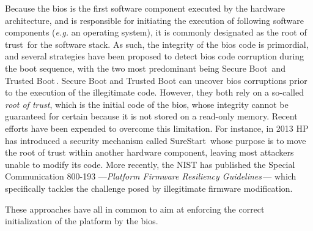 Because the \ac{bios} is the first software component executed by the hardware
architecture, and is responsible for initiating the execution of following
software components (\emph{e.g.} an operating system), it is commonly designated
as the root of trust\,\cite{rutkowska2015intel} for the software stack.
%
As such, the integrity of the \ac{bios} code is primordial, and several
strategies have been proposed to detect \ac{bios} code corruption during the
boot sequence, with the two most predominant being Secure
Boot\,\cite{rosenbaum2012secboot} and Trusted Boot\,\cite{trustedboot}.
%
Secure Boot and Trusted Boot can uncover \ac{bios} corruptions prior to the
execution of the illegitimate code.
%
However, they both rely on a so-called \emph{root of trust}, which is the
initial code of the \ac{bios}, whose integrity cannot be guaranteed for certain
because it is not stored on a read-only memory.
%
Recent efforts have been expended to overcome this limitation.
%
For instance, in 2013 HP has introduced a security mechanism called
SureStart\,\cite{hp2016surestart} whose purpose is to move the root of trust
within another hardware component, leaving most attackers unable to modify its
code.
%
More recently, the NIST has published the Special Communication 800-193
---\emph{Platform Firmware Resiliency
  Guidelines}\,\cite{regenscheid2018nist800193}--- which specifically tackles
the challenge posed by illegitimate firmware modification.

These approaches have all in common to aim at enforcing the correct
initialization of the platform by the \ac{bios}.

